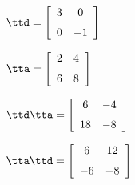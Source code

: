 {$\ttd = \left[ \begin {array}{cc} 3&0\\\noalign{\medskip}0&-1\end {array}
 \right]$
 
$\tta = \left[ \begin {array}{cc} 2&4\\\noalign{\medskip}6&8\end {array}
 \right] $}
{$\ttd\tta= \left[ \begin {array}{cc} 6&-4\\\noalign{\medskip}18&-8\end {array} \right] $

$\tta\ttd =  \left[ \begin {array}{cc} 6&12\\\noalign{\medskip}-6&-8\end {array} \right]$
}
 